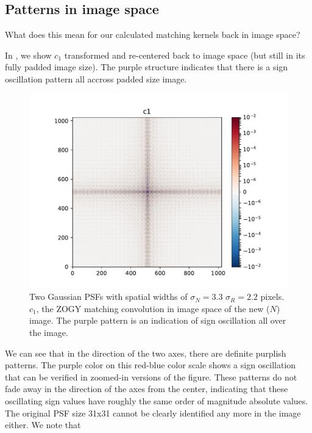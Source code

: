 \documentclass[11pt]{article}
\begin{document}
\subsection{Patterns in image space\label{sec:patterns}}
\par What does this mean for our calculated matching kernels back in
image space?
%
\par In , we show \(c_1\) transformed and
re-centered back to image space (but still in its fully padded image
size). The purple structure indicates that there is a sign oscillation
pattern all accross padded size image.
\begin{figure}
\begin{center}
\includegraphics[width=5.5in]{fig/twoG_defaults_c1.pdf}
\end{center}
\caption{\label{fig:twoG_c1}Two Gaussian PSFs with spatial widths of \(\sigma_N = 3.3\)
  \(\sigma_R = 2.2\) pixels. \(c_1\), the ZOGY matching convolution in image space
  of the new (\(N\)) image. The purple pattern is an indication of
  sign oscillation all over the image.}
\end{figure}
%
\par We can see that in the direction of the two axes, there are definite
purplish patterns. The purple color on this red-blue color scale shows a
sign oscillation that can be verified in zoomed-in versions of the
figure. These patterns do not fade away in the direction of the axes from
the center, indicating that these oscillating sign values have roughly the
same order of magnitude absolute values. The original PSF size 31x31 cannot
be clearly identified any more in the image either. We note that
\end{document}
